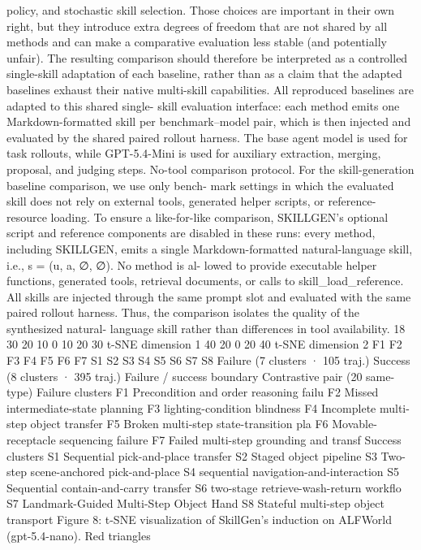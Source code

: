 policy, and stochastic skill selection. Those choices are important in their own right, but they introduce
extra degrees of freedom that are not shared by all methods and can make a comparative evaluation
less stable (and potentially unfair). The resulting comparison should therefore be interpreted as a
controlled single-skill adaptation of each baseline, rather than as a claim that the adapted baselines
exhaust their native multi-skill capabilities. All reproduced baselines are adapted to this shared single-
skill evaluation interface: each method emits one Markdown-formatted skill per benchmark–model
pair, which is then injected and evaluated by the shared paired rollout harness. The base agent model
is used for task rollouts, while GPT-5.4-Mini is used for auxiliary extraction, merging, proposal,
and judging steps.
No-tool comparison protocol.
For the skill-generation baseline comparison, we use only bench-
mark settings in which the evaluated skill does not rely on external tools, generated helper scripts,
or reference-resource loading. To ensure a like-for-like comparison, SKILLGEN’s optional script
and reference components are disabled in these runs: every method, including SKILLGEN, emits
a single Markdown-formatted natural-language skill, i.e., s = (u, a, ∅, ∅). No method is al-
lowed to provide executable helper functions, generated tools, retrieval documents, or calls to
skill\_load\_reference. All skills are injected through the same prompt slot and evaluated with
the same paired rollout harness. Thus, the comparison isolates the quality of the synthesized natural-
language skill rather than differences in tool availability.
18
30
20
10
0
10
20
30
t-SNE dimension 1
40
20
0
20
40
t-SNE dimension 2
F1
F2
F3
F4
F5
F6
F7
S1
S2
S3
S4
S5
S6
S7
S8
Failure  (7 clusters · 105 traj.)
Success  (8 clusters · 395 traj.)
Failure / success boundary
Contrastive pair  (20 same-type)
Failure clusters
F1
Precondition and order reasoning failu
F2
Missed intermediate-state planning
F3
lighting-condition blindness
F4
Incomplete multi-step object transfer 
F5
Broken multi-step state-transition pla
F6
Movable-receptacle sequencing failure
F7
Failed multi-step grounding and transf
Success clusters
S1
Sequential pick-and-place transfer
S2
Staged object pipeline
S3
Two-step scene-anchored pick-and-place
S4
sequential navigation-and-interaction 
S5
Sequential contain-and-carry transfer
S6
two-stage retrieve-wash-return workflo
S7
Landmark-Guided Multi-Step Object Hand
S8
Stateful multi-step object transport
Figure 8: t-SNE visualization of SkillGen’s induction on ALFWorld (gpt-5.4-nano). Red triangles
